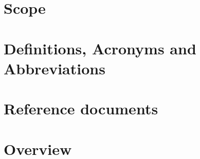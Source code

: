 \section{Scope}

\section{Definitions, Acronyms and Abbreviations}

\section{Reference documents}

\section{Overview}
